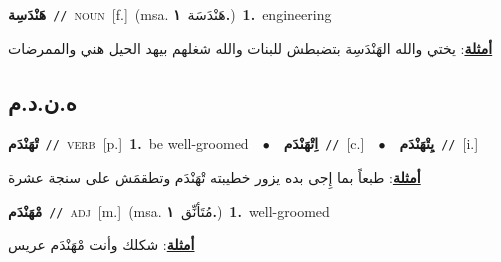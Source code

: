 \documentclass[10pt,a4paper,twoside]{article} %
\begin{document}
\begin{multicols}{2}
{\setlength\topsep{0pt}\textbf{\foreignlanguage{arabic}{هَنْدَسِة}}\ {\color{gray}\texttt{//}\color{black}}\ \textsc{noun}\ [f.]\ \color{gray}(msa. \foreignlanguage{arabic}{هَنْدَسَة}~\foreignlanguage{arabic}{\textbf{١.}})\color{black}\ \textbf{1.}~engineering\  \begin{flushright}\color{gray}\foreignlanguage{arabic}{\textbf{\underline{\foreignlanguage{arabic}{أمثلة}}}: يختي والله الهَنْدَسِة بتضبطش للبنات والله شغلهم بيهد الحيل هني والممرضات}\end{flushright}\color{black}} \vspace{2mm}

\vspace{-3mm}
\subsection*{\color{blue}\foreignlanguage{arabic}{ه.ن.د.م}\color{blue}{}} 

{\setlength\topsep{0pt}\textbf{\foreignlanguage{arabic}{تْهَنْدَم}}\ {\color{gray}\texttt{//}\color{black}}\ \textsc{verb}\ [p.]\ \textbf{1.}~be well-groomed\ \ $\bullet$\ \ \setlength\topsep{0pt}\textbf{\foreignlanguage{arabic}{اِتْهَنْدَم}}\ {\color{gray}\texttt{//}\color{black}}\ [c.]\ \ $\bullet$\ \ \setlength\topsep{0pt}\textbf{\foreignlanguage{arabic}{يِتْهَنْدَم}}\ {\color{gray}\texttt{//}\color{black}}\ [i.]\  \begin{flushright}\color{gray}\foreignlanguage{arabic}{\textbf{\underline{\foreignlanguage{arabic}{أمثلة}}}: طبعاً بما إِجى بده يزور خطيبته تْهَنْدَم وتطقمَش على سنجة عشرة}\end{flushright}\color{black}} \vspace{2mm}

{\setlength\topsep{0pt}\textbf{\foreignlanguage{arabic}{مْهَنْدَم}}\ {\color{gray}\texttt{//}\color{black}}\ \textsc{adj}\ [m.]\ \color{gray}(msa. \foreignlanguage{arabic}{مُتَأنِّق}~\foreignlanguage{arabic}{\textbf{١.}})\color{black}\ \textbf{1.}~well-groomed\  \begin{flushright}\color{gray}\foreignlanguage{arabic}{\textbf{\underline{\foreignlanguage{arabic}{أمثلة}}}: شكلك وأنت مْهَنْدَم عريس}\end{flushright}\color{black}} \vspace{2mm}


\end{multicols}
\end{document}
